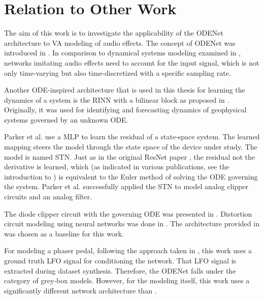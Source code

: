 \section{Relation to Other Work}
\label{sec:relation_to_other_work}
The aim of this work is to investigate the applicability of the ODENet architecture to \ac{VA} modeling of audio effects. The concept of ODENet was introduced in \cite{Chen2018}. In comparison to dynamical systems modeling examined in \cite{Karlsson2019}, networks imitating audio effects need to account for the input signal, which is not only time-varying but also time-discretized with a specific sampling rate. 

Another \ac{ODE}-inspired architecture that is used in this thesis for learning the dynamics of a system is the \ac{RINN} with a bilinear block as proposed in \cite{Fablet2017,Ouala2019}. Originally, it was used for identifying and forecasting dynamics of geophysical systems governed by an unknown ODE.

Parker et al. \cite{Parker2019} use a \ac{MLP} to learn the residual of a state-space system. The learned mapping steers the model through the state space of the device under study. The model is named \ac{STN}. Just as in the original \ac{ResNet} paper \cite{He2015}, the residual not the derivative is learned, which (as indicated in various publications, see the introduction to \cite{Chen2018}) is equivalent to the Euler method of solving the \ac{ODE} governing the system. Parker et al. \cite{Parker2019} successfully applied the \ac{STN} to model analog clipper circuits and an analog filter.

The diode clipper circuit with the governing \ac{ODE} was presented in \cite{Yeh2007,Yeh2008}. Distortion circuit modeling using neural networks was done in \cite{Wright2019,Wright2019a, Wrightetal2020}. The architecture provided in \cite{Wright2019} was chosen as a baseline for this work.

For modeling a phaser pedal, following the approach taken in \cite{Wright2020}, this work uses a ground truth \ac{LFO} signal for conditioning the network. That \ac{LFO} signal is extracted during dataset synthesis. Therefore, the ODENet falls under the category of grey-box models. However, for the modeling itself, this work uses a significantly different network architecture than \cite{Wright2020}.

